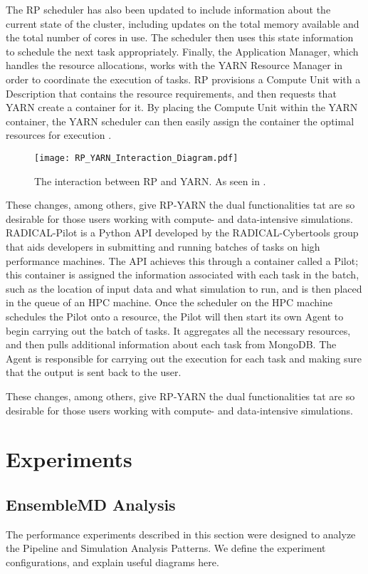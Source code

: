 \documentclass[]{article}
\begin{document}
		The RP scheduler has also been updated to include information about the current state of the cluster, including updates on the total memory available and the total number of cores in use. The scheduler then uses this state information to schedule the next task appropriately. Finally, the Application Manager, which handles the resource allocations, works with the YARN Resource Manager in order to coordinate the execution of tasks. RP provisions a Compute Unit with a Description that contains the resource requirements, and then requests that YARN create a container for it. By placing the Compute Unit within the YARN container, the YARN scheduler can then easily assign the container the optimal resources for execution \cite{hadoop_paper}. 

		\begin{figure}[H]
			\centering
			\texttt{[image: RP\_YARN\_Interaction\_Diagram.pdf]}
			\caption{The interaction between RP and YARN. As seen in \cite{hadoop_paper}.}
			\label{fig:rp_yarn_interaction}
		\end{figure}

		These changes, among others, give RP-YARN the dual functionalities tat are so desirable for those users working with compute- and data-intensive simulations. RADICAL-Pilot is a Python API developed by the RADICAL-Cybertools group that aids developers in submitting and running batches of tasks on high performance machines. The API achieves this through a container called a Pilot; this container is assigned the information associated with each task in the batch, such as the location of input data and what simulation to run, and is then placed in the queue of an HPC machine. Once the scheduler on the HPC machine schedules the Pilot onto a resource, the Pilot will then start its own Agent to begin carrying out the batch of tasks. It aggregates all the necessary resources, and then pulls additional information about each task from MongoDB. The Agent is responsible for carrying out the execution for each task and making sure that the output is sent back to the user.

		These changes, among others, give RP-YARN the dual functionalities tat are so desirable for those users working with compute- and data-intensive simulations. 

\section{Experiments}

	\subsection{EnsembleMD Analysis}
		The performance experiments described in this section were designed to analyze the Pipeline and Simulation Analysis Patterns. We define the experiment configurations, and explain useful diagrams here.
\end{document}
